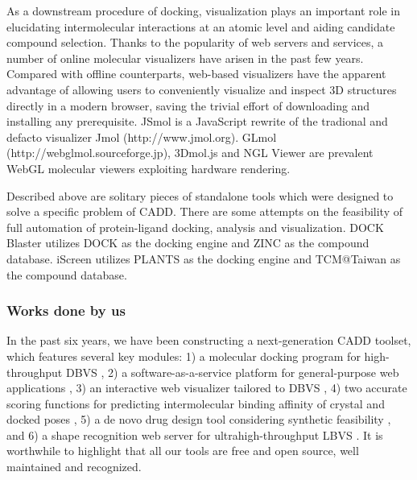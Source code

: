 \documentclass[a4paper,12pt]{article}
\begin{document}
As a downstream procedure of docking, visualization plays an important role in elucidating intermolecular interactions at an atomic level and aiding candidate compound selection. Thanks to the popularity of web servers and services, a number of online molecular visualizers have arisen in the past few years. Compared with offline counterparts, web-based visualizers have the apparent advantage of allowing users to conveniently visualize and inspect 3D structures directly in a modern browser, saving the trivial effort of downloading and installing any prerequisite. JSmol \citep{1314} is a JavaScript rewrite of the tradional and defacto visualizer Jmol (http://www.jmol.org). GLmol (http://webglmol.sourceforge.jp), 3Dmol.js \citep{1652} and NGL Viewer \citep{1666} are prevalent WebGL molecular viewers exploiting hardware rendering.

Described above are solitary pieces of standalone tools which were designed to solve a specific problem of CADD. There are some attempts on the feasibility of full automation of protein-ligand docking, analysis and visualization. DOCK Blaster \citep{557} utilizes DOCK \citep{1222} as the docking engine and ZINC \citep{1178} as the compound database. iScreen \citep{899} utilizes PLANTS \citep{607,779} as the docking engine and TCM@Taiwan \citep{528} as the compound database.

\subsubsection*{Works done by us}

In the past six years, we have been constructing a next-generation CADD toolset, which features several key modules: 1) a molecular docking program for high-throughput DBVS \citep{1153}, 2) a software-as-a-service platform for general-purpose web applications \citep{1362}, 3) an interactive web visualizer tailored to DBVS \citep{1366,1265}, 4) two accurate scoring functions for predicting intermolecular binding affinity of crystal and docked poses \citep{1647,1796,1433,1795,1797,1434}, 5) a de novo drug design tool considering synthetic feasibility \citep{1409,1387}, and 6) a shape recognition web server for ultrahigh-throughput LBVS \citep{1749}. It is worthwhile to highlight that all our tools are free and open source, well maintained and recognized.
\end{document}
